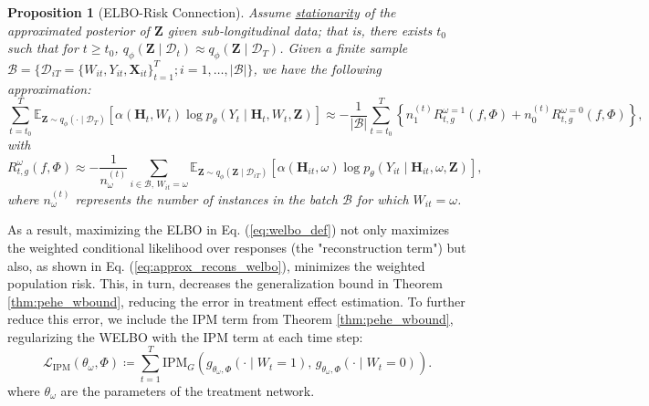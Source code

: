 \documentclass[10pt]{article} %
\newtheorem{proposition}[theorem]{Proposition}
\begin{document}
\begin{proposition}[ELBO-Risk Connection]
\label{prop:approx_factual_risk}
Assume \underline{stationarity} of the approximated posterior of \( \mathbf{Z} \) given sub-longitudinal data; that is, there exists \( t_0 \) such that for \( t \geq t_0 \), \( q_{\phi}(\mathbf{Z} \mid \mathcal{D}_{t}) \approx q_{\phi}(\mathbf{Z} \mid \mathcal{D}_T) \). Given a finite sample \( \mathcal{B} = \{ \mathcal{D}_{iT} = \{ W_{it}, Y_{it}, \mathbf{X}_{it} \}_{t=1}^{T}; i=1, \dots, |\mathcal{B}|\} \), we have the following approximation:
\begin{equation}
\label{eq:approx_recons_welbo}
\sum_{t = t_0}^{T} \mathbb{E}_{\mathbf{Z} \sim q_{\phi}(\cdot \mid \mathcal{D}_T)} 
\left[ \alpha(\mathbf{H}_t, W_t) \log p_{\theta}(Y_{t} \mid \mathbf{H}_t, W_t, \mathbf{Z}) \right] \approx - \frac{1}{|\mathcal{B}|} \sum_{t = t_0}^{T} \left\{ n_{1}^{(t)} R^{\omega = 1}_{t, g}\left(f, \Phi \right) + n_{0}^{(t)} R^{\omega = 0}_{t, g}\left(f, \Phi \right) \right\},  
\end{equation}
with
\[
R^{\omega}_{t, g}\left(f, \Phi \right) \approx -\frac{1}{n_{\omega}^{(t)}} \sum_{i \in \mathcal{B}, \, W_{it} = \omega } \mathbb{E}_{\mathbf{Z} \sim q_{\phi}(\mathbf{Z} \mid \mathcal{D}_{iT})} \left[ 
\alpha(\mathbf{H}_{it}, \omega) \log p_{\theta}(Y_{it} \mid \mathbf{H}_{it}, \omega, \mathbf{Z}) \right],
\]
where \( n_{\omega}^{(t)} \) represents the number of instances in the batch \( \mathcal{B} \) for which \( W_{it} = \omega \).
\end{proposition}
As a result, maximizing the ELBO in Eq. (\ref{eq:welbo_def}) not only maximizes the weighted conditional likelihood over responses (the "reconstruction term") but also, as shown in Eq. (\ref{eq:approx_recons_welbo}), minimizes the weighted population risk. This, in turn, decreases the generalization bound in Theorem \ref{thm:pehe_wbound}, reducing the error in treatment effect estimation. To further reduce this error, we include the IPM term from Theorem \ref{thm:pehe_wbound}, regularizing the WELBO with the IPM term at each time step: 
\[
\mathcal{L}_{\mathrm{IPM}}(\theta_{\omega}, \Phi) \coloneqq \sum_{t=1}^T \mathrm{IPM}_{G} \left( g_{\theta_{\omega}, \Phi}(\cdot \mid W_t = 1), \, g_{\theta_{\omega}, \Phi}(\cdot \mid W_t = 0) \right).
\]
where \(\theta_{\omega}\) are the parameters of the treatment network. 
\end{document}
